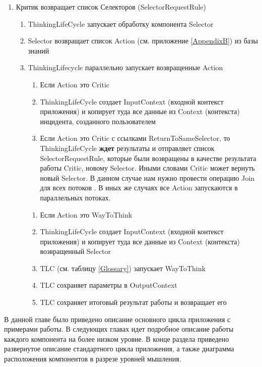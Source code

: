 \begin{enumerate}
	\item Критик возвращает список Селекторов (SelectorRequestRule)
	\begin{enumerate}
	\item ThinkingLifeCycle запускает обработку компонента Selector
	\item Selector возвращает список Action (см. приложение \ref{AppendixB}) из базы знаний
	\item ThinkingLifecycle параллельно запускает возвращенные Action
	\begin{enumerate}
	\item Если Action это Critic
	\item ThinkingLifeCycle создает InputContext (входной контекст приложения) и копирует туда все данные из Context (контекста) инцидента, созданного пользователем
	\item Если Action это Critic с ссылками ReturnToSameSelector, то ThinkingLifeCycle \textbf{ждет} результаты и отправляет список SelectorRequestRule, которые были возвращены в качестве результата работы Critic, новому Selector. Иными словами Critic может вернуть новый Selector. В данном случае нам нужно провести операцию Join для всех потоков \cite{JavaConcurrency}. В иных же случаях все Action запускаются в параллельных потоках.
	\end{enumerate} 
	\begin{enumerate}
	\item Если Action это WayToThink
	\item ThinkingLifeCycle создает InputContext (входной контекст приложения) и копирует туда все данные из Context (контекста) возвращенный Selector
	\item TLC (см. таблицу \ref{Glossary}) запускает WayToThink
	\item TLC сохраняет параметры в OutputContext
	\item TLC сохраняет итоговый результат работы и возвращает его 
	\end{enumerate} 
	\end{enumerate}
\end{enumerate} \par
В данной главе было приведено описание основного цикла приложения с примерами работы. В следующих главах идет подробное описание работы каждого компонента на более низком уровне. В конце раздела приведено развернутое описание стандартного цикла приложения, а также диаграмма расположения компонентов в разрезе уровней мышления.
\clearpage
